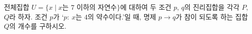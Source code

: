 전체집합 $U=\{x \mid x$는 $7$ 이하의 자연수$\}$에 대하여 두 조건 $p$, $q$의 진리집합을 각각 $P$, $Q$라 하자. 조건 $p$가 ‘$p:\ x$는 $4$의 약수이다.’일 때, 명제 $p\longrightarrow q$가 참이 되도록 하는 집합 $Q$의 개수를 구하시오.
